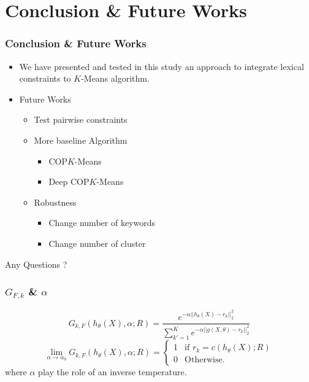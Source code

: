 \documentclass{beamer}
\begin{document}
\section{Conclusion \& Future Works}

\begin{frame}
  \frametitle{Conclusion \& Future Works}
\begin{itemize}
\item We have presented and tested in this study an approach to integrate lexical constraints to $K$-Means algorithm. \pause 
\item Future Works
\begin{itemize}
\item Test pairwise constraints
\item More baseline Algorithm
\begin{itemize}
\item COP$K$-Means
\item Deep COP$K$-Means
\end{itemize}
\item Robustness
\begin{itemize}
\item Change number of keywords
\item Change number of cluster
\end{itemize}
\end{itemize}
\end{itemize}
\end{frame}

\begin{frame}
Any Questions ?
\end{frame}

\begin{frame}
\frametitle{$G_{F,k}$ \& $\alpha$}
\begin{equation*}
G_{k, F}(h_{\theta}(X), \alpha; R) = \frac{e^{-\alpha ||h_\theta(X) - r_k||_2^2}}
{\sum_{k' = 1}^K e^{-\alpha ||g(X, \theta) - r_k||_2^2}}
\end{equation*}
\begin{equation*}
  \lim\limits_{\alpha \rightarrow \alpha_0}G_{k, F}(h_\theta(X), \alpha; R) = \left\{
\begin{array}{ll}
  1 & \mbox{if }r_k = c(h_\theta(X); R)\\
  0 & \mbox{Otherwise.}
\end{array}
\right.
\end{equation*}
where $\alpha$ play the role of an inverse temperature.
\end{frame}
\end{document}

